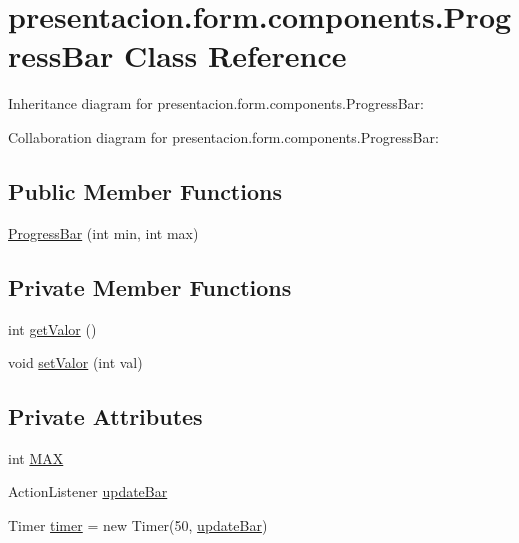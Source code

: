 \hypertarget{classpresentacion_1_1form_1_1components_1_1ProgressBar}{}\section{presentacion.\+form.\+components.\+Progress\+Bar Class Reference}
\label{classpresentacion_1_1form_1_1components_1_1ProgressBar}


Inheritance diagram for presentacion.\+form.\+components.\+Progress\+Bar\+:


Collaboration diagram for presentacion.\+form.\+components.\+Progress\+Bar\+:
\subsection*{Public Member Functions}
\begin{DoxyCompactItemize}
\item 
\hyperlink{classpresentacion_1_1form_1_1components_1_1ProgressBar_a1deb4ce0d79cfafe36be10ff9087b392}{Progress\+Bar} (int min, int max)
\end{DoxyCompactItemize}
\subsection*{Private Member Functions}
\begin{DoxyCompactItemize}
\item 
int \hyperlink{classpresentacion_1_1form_1_1components_1_1ProgressBar_ad4a771a1e071efde0956a8984ad91eb1}{get\+Valor} ()
\item 
void \hyperlink{classpresentacion_1_1form_1_1components_1_1ProgressBar_af0d9d64e51ca6cf141e76ecfa189de29}{set\+Valor} (int val)
\end{DoxyCompactItemize}
\subsection*{Private Attributes}
\begin{DoxyCompactItemize}
\item 
int \hyperlink{classpresentacion_1_1form_1_1components_1_1ProgressBar_a3f6a2544b74d1b12812202c794bd0495}{M\+AX}
\item 
Action\+Listener \hyperlink{classpresentacion_1_1form_1_1components_1_1ProgressBar_a9adac61cfc9de30406abd2bdce99b897}{update\+Bar}
\item 
Timer \hyperlink{classpresentacion_1_1form_1_1components_1_1ProgressBar_a6be2ec470ec1683c37b1d6c44c3981ca}{timer} = new Timer(50, \hyperlink{classpresentacion_1_1form_1_1components_1_1ProgressBar_a9adac61cfc9de30406abd2bdce99b897}{update\+Bar})
\end{DoxyCompactItemize}


